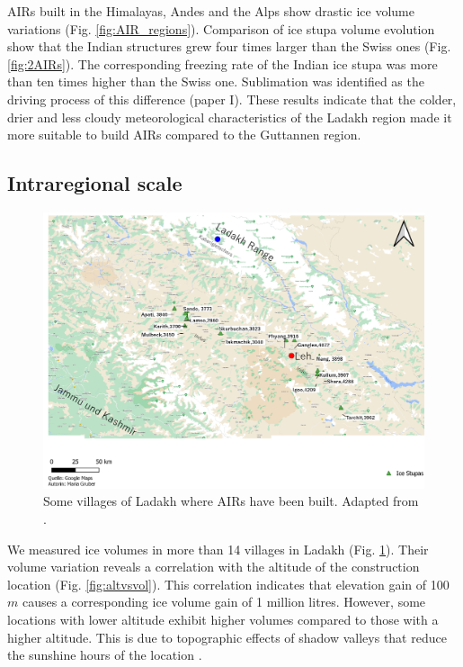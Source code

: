 \ac{AIRs} built in the Himalayas, Andes and the Alps show drastic ice volume variations (Fig. \ref{fig:AIR_regions}).
Comparison of ice stupa volume evolution show that the Indian structures grew four times larger than the Swiss ones (Fig.
\ref{fig:2AIRs}). The corresponding freezing rate of the Indian ice stupa was more than ten times higher than
the Swiss one. Sublimation was identified as the driving process of this difference (paper I). These results indicate that the
colder, drier and less cloudy meteorological characteristics of the Ladakh region made it more suitable to build \ac{AIRs}
compared to the Guttannen region. 

\subsection{Intraregional scale}

\begin{figure}[htb]
	\includegraphics[width=\textwidth]{figs/ISC_villages}
  \caption{Some villages of Ladakh where \ac{AIRs} have been built. Adapted from \citet{mariagruberIceStupasLadakh2022}.}
	\label{fig:villages}
\end{figure}

We measured ice volumes in more than 14 villages in Ladakh (Fig. \ref{fig:villages}). Their volume variation
reveals a correlation with the altitude of the construction location (Fig. \ref{fig:altvsvol}). This correlation
indicates that elevation gain of 100 $m$ causes a corresponding ice volume gain of 1 million litres. However,
some locations with lower altitude exhibit higher volumes compared to those with a higher altitude. This is due
to topographic effects of shadow valleys that reduce the sunshine hours of the location
\citep{mariagruberIceStupasLadakh2022}.

